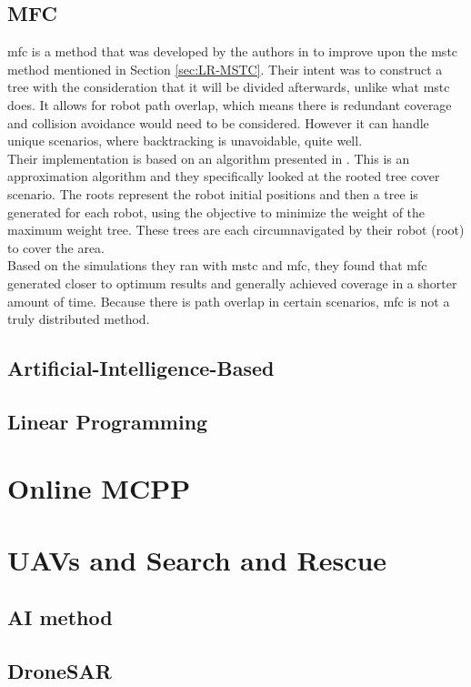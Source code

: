 \subsection{MFC}
\ac{mfc} is a method that was developed by the authors in \cite{Zheng2005} to improve upon the \ac{mstc} method mentioned in Section \ref{sec:LR-MSTC}. Their intent was to construct a tree with the consideration that it will be divided afterwards, unlike what \ac{mstc} does. It allows for robot path overlap, which means there is redundant coverage and collision avoidance would need to be considered. However it can handle unique scenarios, where backtracking is unavoidable, quite well.\\ 
Their implementation is based on an algorithm presented in \cite{Even2003}. This is an approximation algorithm and they specifically looked at the rooted tree cover scenario. The roots represent the robot initial positions and then a tree is generated for each robot, using the objective to minimize the weight of the maximum weight tree. These trees are each circumnavigated by their robot (root) to cover the area.\\
Based on the simulations they ran with \ac{mstc} and \ac{mfc}, they found that \ac{mfc} generated closer to optimum results and generally achieved coverage in a shorter amount of time.	Because there is path overlap in certain scenarios, \ac{mfc} is not a truly distributed method.
\subsection{Artificial-Intelligence-Based}
\subsection{Linear Programming}
\section{Online MCPP}
\label{sec:LR Online MCPP}
\section{UAVs and Search and Rescue}
\subsection{AI method}
\subsection{DroneSAR}


